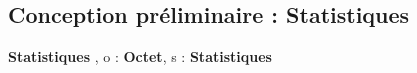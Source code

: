 \subsection{Conception préliminaire : Statistiques}

\begin{algorithme}
    {}{\textbf{Statistiques}}
    {}
    {, }
    {}
    {o : \textbf{Octet}, s : \textbf{Statistiques}}
    {\naturel}
    {}
\end{algorithme}